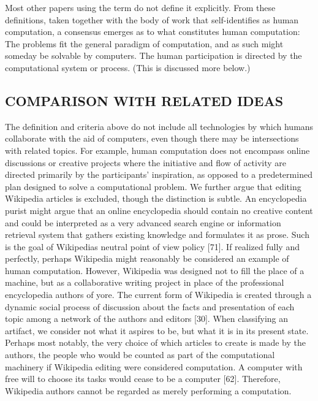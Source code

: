 \documentclass{sig-alternate}
\begin{document}





  
Most other papers using the term do not define it explicitly. From these definitions, taken together with the body of work that self-identifies as human computation, a consensus emerges as to what constitutes human computation:
 The problems fit the general paradigm of computation, and as such might someday be solvable by computers.
 The human participation is directed by the computational system or process. (This is discussed more below.)
\subsection*{COMPARISON WITH RELATED IDEAS}
The definition and criteria above do not include all technologies by which humans collaborate with the aid of computers, even though there may be intersections with related topics. For example, human computation does not encompass online discussions or creative projects where the initiative and flow of activity are directed primarily by the participants’ inspiration, as opposed to a predetermined plan designed to solve a computational problem.
We further argue that editing Wikipedia articles is excluded, though the distinction is subtle. An encyclopedia purist might argue that an online encyclopedia should contain no creative content and could be interpreted as a very advanced search engine or information retrieval system that gathers existing knowledge and formulates it as prose. Such is the goal of Wikipedias  neutral point of view policy [71]. If realized fully and perfectly, perhaps Wikipedia might reasonably be considered an example of human computation. However, Wikipedia was designed not to fill the place of a machine, but as a collaborative writing project in place of the professional encyclopedia authors of yore. The current form of Wikipedia is created through a dynamic social process of discussion about the facts and presentation of each topic among a network of the authors and editors [30]. When classifying an artifact, we consider not what it aspires to be, but what it is in its present state.
Perhaps most notably, the very choice of which articles to create is made by the authors, the people who would be counted as part of the computational machinery if Wikipedia editing were considered computation. A computer with free will to choose its tasks would cease to be a computer [62]. Therefore, Wikipedia authors cannot be regarded as merely performing a computation.
\end{document}
